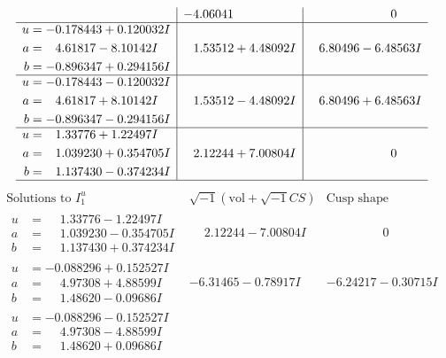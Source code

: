\documentclass[1p]{elsarticle_modified}
\theoremstyle{definition}
\newcommand{\I}{\sqrt{-1}}
\begin{document}
$$\begin{array}{c|c|c}
 & -4.06041\phantom{ +0.000000I} & \phantom{-0.000000 } 0 \\ \hline\begin{aligned}
u &= -0.178443 + 0.120032 I \\
a &= \phantom{-}4.61817 - 8.10142 I \\
b &= -0.896347 + 0.294156 I\end{aligned}
 & \phantom{-}1.53512 + 4.48092 I & \phantom{-}6.80496 - 6.48563 I \\ \hline\begin{aligned}
u &= -0.178443 - 0.120032 I \\
a &= \phantom{-}4.61817 + 8.10142 I \\
b &= -0.896347 - 0.294156 I\end{aligned}
 & \phantom{-}1.53512 - 4.48092 I & \phantom{-}6.80496 + 6.48563 I \\ \hline\begin{aligned}
u &= \phantom{-}1.33776 + 1.22497 I \\
a &= \phantom{-}1.039230 + 0.354705 I \\
b &= \phantom{-}1.137430 - 0.374234 I\end{aligned}
 & \phantom{-}2.12244 + 7.00804 I & \phantom{-0.000000 } 0\\
 \hline 
 \end{array}$$\newpage$$\begin{array}{c|c|c}  
\text{Solutions to }I^u_{1}& \I (\text{vol} + \sqrt{-1}CS) & \text{Cusp shape}\\
 \hline 
\begin{aligned}
u &= \phantom{-}1.33776 - 1.22497 I \\
a &= \phantom{-}1.039230 - 0.354705 I \\
b &= \phantom{-}1.137430 + 0.374234 I\end{aligned}
 & \phantom{-}2.12244 - 7.00804 I & \phantom{-0.000000 } 0 \\ \hline\begin{aligned}
u &= -0.088296 + 0.152527 I \\
a &= \phantom{-}4.97308 + 4.88599 I \\
b &= \phantom{-}1.48620 - 0.09686 I\end{aligned}
 & -6.31465 - 0.78917 I & -6.24217 - 0.30715 I \\ \hline\begin{aligned}
u &= -0.088296 - 0.152527 I \\
a &= \phantom{-}4.97308 - 4.88599 I \\
b &= \phantom{-}1.48620 + 0.09686 I\end{aligned}

\end{array}$$
\end{document}
